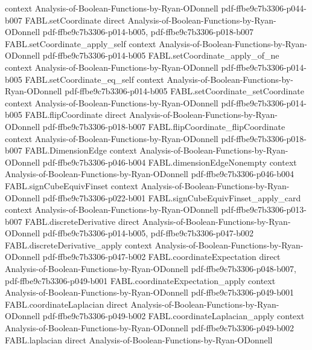 \begin{theorem}
  {context}
  {Analysis-of-Boolean-Functions-by-Ryan-ODonnell}
  {pdf-ffbe9c7b3306-p044-b007}
\proofstep
  {FABL.setCoordinate}
  {direct}
  {Analysis-of-Boolean-Functions-by-Ryan-ODonnell}
  {pdf-ffbe9c7b3306-p014-b005,
    pdf-ffbe9c7b3306-p018-b007}
\proofstep
  {FABL.setCoordinate_apply_self}
  {context}
  {Analysis-of-Boolean-Functions-by-Ryan-ODonnell}
  {pdf-ffbe9c7b3306-p014-b005}
\proofstep
  {FABL.setCoordinate_apply_of_ne}
  {context}
  {Analysis-of-Boolean-Functions-by-Ryan-ODonnell}
  {pdf-ffbe9c7b3306-p014-b005}
\proofstep
  {FABL.setCoordinate_eq_self}
  {context}
  {Analysis-of-Boolean-Functions-by-Ryan-ODonnell}
  {pdf-ffbe9c7b3306-p014-b005}
\proofstep
  {FABL.setCoordinate_setCoordinate}
  {context}
  {Analysis-of-Boolean-Functions-by-Ryan-ODonnell}
  {pdf-ffbe9c7b3306-p014-b005}
\proofstep
  {FABL.flipCoordinate}
  {direct}
  {Analysis-of-Boolean-Functions-by-Ryan-ODonnell}
  {pdf-ffbe9c7b3306-p018-b007}
\proofstep
  {FABL.flipCoordinate_flipCoordinate}
  {context}
  {Analysis-of-Boolean-Functions-by-Ryan-ODonnell}
  {pdf-ffbe9c7b3306-p018-b007}
\proofstep
  {FABL.DimensionEdge}
  {context}
  {Analysis-of-Boolean-Functions-by-Ryan-ODonnell}
  {pdf-ffbe9c7b3306-p046-b004}
\proofstep
  {FABL.dimensionEdgeNonempty}
  {context}
  {Analysis-of-Boolean-Functions-by-Ryan-ODonnell}
  {pdf-ffbe9c7b3306-p046-b004}
\proofstep
  {FABL.signCubeEquivFinset}
  {context}
  {Analysis-of-Boolean-Functions-by-Ryan-ODonnell}
  {pdf-ffbe9c7b3306-p022-b001}
\proofstep
  {FABL.signCubeEquivFinset_apply_card}
  {context}
  {Analysis-of-Boolean-Functions-by-Ryan-ODonnell}
  {pdf-ffbe9c7b3306-p013-b007}
\proofstep
  {FABL.discreteDerivative}
  {direct}
  {Analysis-of-Boolean-Functions-by-Ryan-ODonnell}
  {pdf-ffbe9c7b3306-p014-b005,
    pdf-ffbe9c7b3306-p047-b002}
\proofstep
  {FABL.discreteDerivative_apply}
  {context}
  {Analysis-of-Boolean-Functions-by-Ryan-ODonnell}
  {pdf-ffbe9c7b3306-p047-b002}
\proofstep
  {FABL.coordinateExpectation}
  {direct}
  {Analysis-of-Boolean-Functions-by-Ryan-ODonnell}
  {pdf-ffbe9c7b3306-p048-b007,
    pdf-ffbe9c7b3306-p049-b001}
\proofstep
  {FABL.coordinateExpectation_apply}
  {context}
  {Analysis-of-Boolean-Functions-by-Ryan-ODonnell}
  {pdf-ffbe9c7b3306-p049-b001}
\proofstep
  {FABL.coordinateLaplacian}
  {direct}
  {Analysis-of-Boolean-Functions-by-Ryan-ODonnell}
  {pdf-ffbe9c7b3306-p049-b002}
\proofstep
  {FABL.coordinateLaplacian_apply}
  {context}
  {Analysis-of-Boolean-Functions-by-Ryan-ODonnell}
  {pdf-ffbe9c7b3306-p049-b002}
\proofstep
  {FABL.laplacian}
  {direct}
  {Analysis-of-Boolean-Functions-by-Ryan-ODonnell}

\end{theorem}
